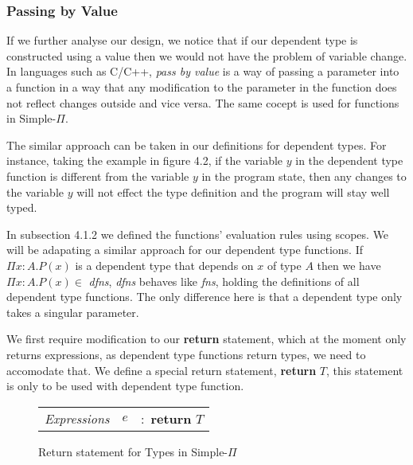 \documentclass[a4paper,12pt]{report}
\begin{document}
\subsubsection{Passing by Value}

If we further analyse our design, we notice that if our dependent type is 
constructed using a value then we would not have the problem of variable change. 
In languages such as C/C++, \textit{pass by value} \cite{pbv} is a way of 
passing a parameter into a function in a way that any modification to the 
parameter in the function does not reflect changes outside and vice versa. The 
same cocept is used for functions in Simple-$\Pi$.

\par
The similar approach can be taken in our definitions for dependent types. For 
instance, taking the example in figure 4.2, if the variable $y$ in the dependent 
type function is different from the variable $y$ in the program state, then any 
changes to the variable $y$ will not effect the type definition and the program 
will stay well typed.
 
\par
In subsection 4.1.2 we defined the functions' evaluation rules using scopes. 
We will be adapating a similar approach for our dependent type functions. If 
$\Pi x : A. P(x)$ is a dependent type that depends on $x$ of type $A$ then we have  
$\Pi x : A.P(x) \in $ \textit{dfns}, \textit{dfns} behaves like \textit{fns}, 
holding the definitions of all dependent type functions. The only difference 
here is that a dependent type only takes a singular parameter. 

\par
We first require modification to our \textbf{return} statement, which at the 
moment only returns expressions, as dependent type functions return types, we 
need to accomodate that. We define a special return statement, \textbf{return } 
$T$, this statement is only to be used with dependent type function. 

\begin{figure}[H]
  \begin{center}
    \begin{tabular} {l l l}
      \textit{Expressions} & $e$& $:$ $\textbf{return }T$ \\
    \end{tabular}
  \end{center}
  \caption{Return statement for Types in Simple-$\Pi$}
\end{figure}
\end{document}
